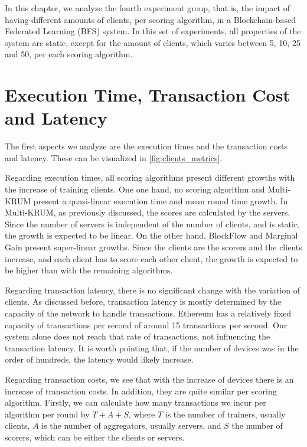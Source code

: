 In this chapter, we analyze the fourth experiment group, that is, the impact of having different amounts of clients, per scoring algorithm, in a Blockchain-based Federated Learning (BFS) system. In this set of experiments, all properties of the system are static, except for the amount of clients, which varies between 5, 10, 25 and 50, per each scoring algorithm.

\section{Execution Time, Transaction Cost and Latency}

The first aspects we analyze are the execution times and the transaction costs and latency. These can be visualized in \autoref{fig:clients_metrics}.

Regarding execution times, all scoring algorithms present different growths with the increase of training clients. One one hand, no scoring algorithm and Multi-KRUM present a quasi-linear execution time and mean round time growth. In Multi-KRUM, as previously discussed, the scores are calculated by the servers. Since the number of servers is independent of the number of clients, and is static, the growth is expected to be linear. On the other hand, BlockFlow and Marginal Gain present super-linear growths. Since the clients are the scorers and the clients increase, and each client has to score each other client, the growth is expected to be higher than with the remaining algorithms.

Regarding transaction latency, there is no significant change with the variation of clients. As discussed before, transaction latency is mostly determined by the capacity of the network to handle transactions. Ethereum has a relatively fixed capacity of transactions per second of around 15 transactions per second. Our system alone does not reach that rate of transactions, not influencing the transaction latency. It is worth pointing that, if the number of devices was in the order of hundreds, the latency would likely increase.

Regarding transaction costs, we see that with the increase of devices there is an increase of transaction costs. In addition, they are quite similar per scoring algorithm. Firstly, we can calculate how many transactions we incur per algorithm per round by $T+A+S$, where $T$ is the number of trainers, usually clients, $A$ is the number of aggregators, usually servers, and $S$ the number of scorers, which can be either the clients or servers.

